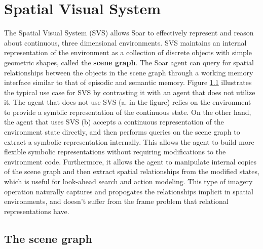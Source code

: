 \chapter{Spatial Visual System}
\label{SVS}

\begin{figure}
	\label{fig:svs-setup}
\end{figure}

The Spatial Visual System (SVS) allows Soar to effectively represent and reason about continuous, three dimensional environments.
SVS maintains an internal representation of the environment as a collection of discrete objects with simple geometric shapes, called the \textbf{scene graph}.
The Soar agent can query for spatial relationships between the objects in the scene graph through a working memory interface similar to that of episodic and semantic memory.
Figure \ref{fig:svs-setup} illustrates the typical use case for SVS by contrasting it with an agent that does not utilize it.
The agent that does not use SVS (a. in the figure) relies on the environment to provide a symblic representation of the continuous state.
On the other hand, the agent that uses SVS (b) accepts a continuous representation of the environment state directly, and then performs queries on the scene graph to extract a symbolic representation internally.
This allows the agent to build more flexible symbolic representations without requiring modifications to the environment code.
Furthermore, it allows the agent to manipulate internal copies of the scene graph and then extract spatial relationships from the modified states, which is useful for look-ahead search and action modeling.
This type of imagery operation naturally captures and propogates the relationships implicit in spatial environments, and doesn't suffer from the frame problem that relational representations have.


\section{The scene graph}

